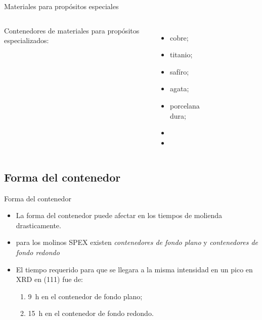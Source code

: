 \documentclass[%
spanish,
progressbar=head,
subsectionpage,
aspectratio=169
]{beamer}
\begin{document}
\begin{frame}{Materiales para propósitos especiales}
    \begin{columns}
        \small
    Contenedores de materiales para propósitos especializados:
    \begin{itemize}
        \item<1-> cobre;
        \item<2-> titanio;
        \item<3-> safíro;
        \item<4-> agata;
        \item<5-> porcelana dura;
        \item<6-> 
        \item<7-> 
    \end{itemize}
    \begin{figure}
        \begin{center}
        \begin{overprint}
        \end{overprint}
        \end{center}
    \end{figure}
    \end{columns}
\end{frame}

\subsection{Forma del contenedor}

\begin{frame}{Forma del contenedor}
\begin{itemize}
    \item<1-> La forma del contenedor puede afectar en los tiempos de molienda drasticamente.
    \item<2-> para los molinos SPEX existen \emph{contenedores de fondo plano} y \emph{contenedores de fondo redondo}
    \item<3-> El tiempo requerido para que se llegara a la misma intensidad en un pico en XRD en (111) fue de:
    \begin{enumerate}
        \item \qty{9}{\hour} en el contenedor de fondo plano;
        \item \qty{15}{\hour} en el contenedor de fondo redondo.
    \end{enumerate}
\end{itemize}
\end{frame}
\end{document}
